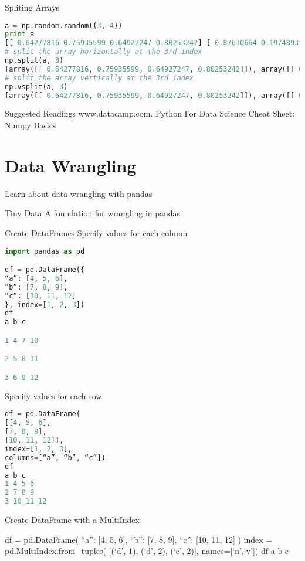 Spliting Arrays

\begin{lstlisting}[language=Python]
a = np.random.random((3, 4))
print a
[[ 0.64277816 0.75935599 0.64927247 0.80253242] [ 0.87630664 0.19748931 0.51895547 0.83645583] [ 0.03132085 0.043291 0.10945252 0.31883126]]
# split the array horizontally at the 3rd index
np.split(a, 3)
[array([[ 0.64277816, 0.75935599, 0.64927247, 0.80253242]]), array([[ 0.87630664, 0.19748931, 0.51895547, 0.83645583]]), array([[ 0.03132085, 0.043291 , 0.10945252, 0.31883126]])]
# split the array vertically at the 3rd index
np.vsplit(a, 3)
[array([[ 0.64277816, 0.75935599, 0.64927247, 0.80253242]]), array([[ 0.87630664, 0.19748931, 0.51895547, 0.83645583]]), array([[ 0.03132085, 0.043291 , 0.10945252, 0.31883126]])]
\end{lstlisting}

Suggested Readings
www.datacamp.com. Python For Data Science Cheat Sheet: Numpy Basics

\section{Data Wrangling}

Learn about data wrangling with pandas

Tiny Data
A foundation for wrangling in pandas

Create DataFrames
Specify values for each column

\begin{lstlisting}[language=Python]
import pandas as pd

df = pd.DataFrame({
“a”: [4, 5, 6],
“b”: [7, 8, 9],
“c”: [10, 11, 12]
}, index=[1, 2, 3])
df
a b c

1 4 7 10

2 5 8 11

3 6 9 12
\end{lstlisting}

Specify values for each row

\begin{lstlisting}[language=Python]
df = pd.DataFrame(
[[4, 5, 6],
[7, 8, 9],
[10, 11, 12]],
index=[1, 2, 3],
columns=[“a”, “b”, “c”])
df
a b c
1 4 5 6
2 7 8 9
3 10 11 12
\end{lstlisting}

Create DataFrame with a MultiIndex

df = pd.DataFrame({
“a”: [4, 5, 6],
“b”: [7, 8, 9],
“c”: [10, 11, 12]
})
index = pd.MultiIndex.from_tuples(
[(‘d’, 1), (‘d’, 2), (‘e’, 2)],
names=[‘n’,‘v’])
df
a b c

